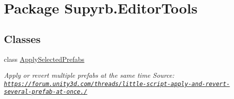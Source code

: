 \hypertarget{namespace_supyrb_1_1_editor_tools}{\section{Package Supyrb.\-Editor\-Tools}
\label{namespace_supyrb_1_1_editor_tools}
}
\subsection*{Classes}
\begin{DoxyCompactItemize}
\item 
class \hyperlink{class_supyrb_1_1_editor_tools_1_1_apply_selected_prefabs}{Apply\-Selected\-Prefabs}
\begin{DoxyCompactList}\small\item\em Apply or revert multiple prefabs at the same time Source\-: \href{https://forum.unity3d.com/threads/little-script-apply-and-revert-several-prefab-at-once.295311/}{\tt https\-://forum.\-unity3d.\-com/threads/little-\/script-\/apply-\/and-\/revert-\/several-\/prefab-\/at-\/once./} \end{DoxyCompactList}\end{DoxyCompactItemize}
